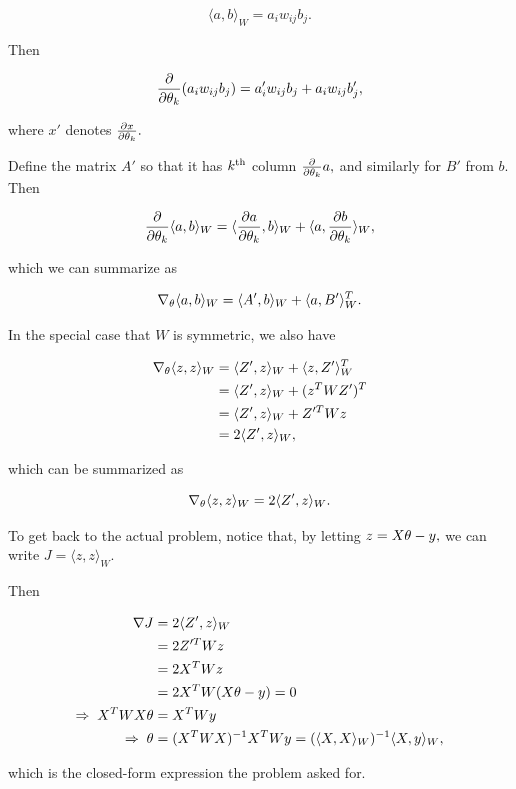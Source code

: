 \documentclass[]{article}
\begin{document}
\[\langle a, b \rangle_W = a_i w_{ij} b_j.\]

Then

\[\frac{\partial}{\partial \theta_k}(a_i w_{ij} b_j) = a'_i w_{ij} b_j + a_i w_{ij} b'_j,\]

where \(x'\) denotes \(\frac{\partial x}{\partial \theta_k}.\)

Define the matrix \(A'\) so that it has \(k^\text{th}\) column
\(\frac{\partial}{\partial \theta_k} a,\) and similarly for \(B'\) from \(b.\) Then

\[\frac{\partial}{\partial \theta_k}\langle a, b\rangle_W
  = \langle \frac{\partial a}{\partial \theta_k}, b \rangle_W
  + \langle a, \frac{\partial b}{\partial \theta_k} \rangle_W,\]

which we can summarize as

\[\nabla_\theta \langle a, b\rangle_W = \langle A',b \rangle_W
                                   + \langle a,B' \rangle_W^T.\]

In the special case that \(W\) is symmetric, we also have

\[\begin{aligned}
\nabla_\theta \langle z, z \rangle_W
  & = \langle Z', z\rangle_W + \langle z, Z' \rangle_W^T \\
  & = \langle Z', z\rangle_W + (z^T W Z')^T \\
  & = \langle Z', z\rangle_W + Z'^T W z \\
  & = 2 \langle Z', z\rangle_W, \\
\end{aligned}\]

which can be summarized as

\[\nabla_\theta \langle z, z \rangle_W = 2\langle Z', z\rangle_W.\]

To get back to the actual problem, notice that, by letting
\(z = X\theta - y,\) we can write \(J = \langle z, z \rangle_W.\)

Then

\[\begin{aligned}
\nabla J & = 2\langle Z', z\rangle_W \\
& = 2 Z'^T W z \\
& = 2 X^T W z \\
& = 2 X^T W (X \theta - y) = 0 \\
\Rightarrow \; X^T W X \theta & = X^T W y \\
\Rightarrow \; \theta & = (X^T W X)^{-1} X^T W y
 = (\langle X, X\rangle_W)^{-1} \langle X, y \rangle_W, \\
\end{aligned}\]

which is the closed-form expression the problem asked for.
\end{document}
